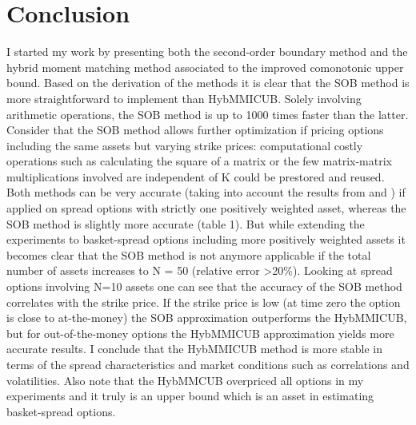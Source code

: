 \documentclass[a4paper]{article}
\begin{document}
\section{Conclusion}
\label{sec:conclusion}
I started my work by presenting both the second-order boundary method and the hybrid moment matching method associated to the improved comonotonic upper bound. Based on the derivation of the methods it is clear that the SOB method is more straightforward to implement than HybMMICUB. Solely involving arithmetic operations, the SOB method is up to 1000 times faster than the latter. Consider that the SOB method allows further optimization if pricing options including the same assets but varying strike prices: computational costly operations such as calculating the square of a matrix or the few matrix-matrix multiplications involved are independent of K could be prestored and reused.\\
Both methods can be very accurate (taking into account the results from \cite{sob} and \cite{hybmmicub}) if applied on spread options with strictly one positively weighted asset, whereas the SOB method is slightly more accurate (table 1).  But while extending the experiments to basket-spread options including more positively weighted assets it becomes clear that the SOB method is not anymore applicable if the total number of assets increases to N = 50 (relative error >20\%). Looking at spread options involving N=10 assets one can see that the accuracy of the SOB method correlates with the strike price. If the strike price is low (at time zero the option is close to at-the-money) the SOB approximation outperforms the HybMMICUB, but for out-of-the-money options the HybMMICUB approximation yields more accurate results. I conclude that the HybMMICUB method is more stable in terms of the spread characteristics and market conditions such as correlations and volatilities. Also note that the HybMMCUB overpriced all options in my experiments and it truly is an upper bound which is an asset in estimating basket-spread options.
\end{document}

